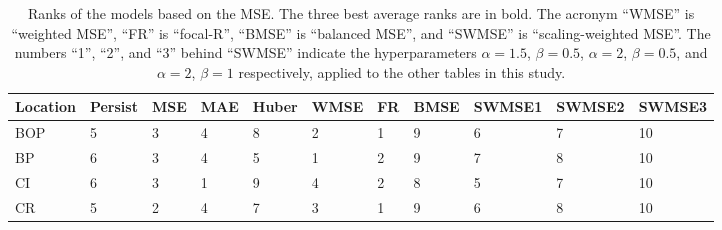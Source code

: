 \documentclass[11pt, a4paper]{article}
\begin{document}
\begin{table}[H]
\centering
\fontsize{5}{6}\selectfont
\caption{Ranks of the models based on the MSE. The three best average ranks are in bold. The acronym ``WMSE'' is ``weighted MSE'', ``FR'' is ``focal-R'', ``BMSE'' is ``balanced MSE'', and ``SWMSE'' is ``scaling-weighted MSE''. The numbers ``1'', ``2'', and ``3'' behind ``SWMSE'' indicate the hyperparameters $\alpha=1.5$, $\beta=0.5$, $\alpha=2$, $\beta=0.5$, and $\alpha=2$, $\beta=1$ respectively, applied to the other tables in this study.}\label{tb:rankmse}
\begin{tabular}{lllllllllll}
\multicolumn{1}{c}{\textbf{Location}} & \multicolumn{1}{c}{\textbf{Persist}} & \multicolumn{1}{c}{\textbf{MSE}} & \multicolumn{1}{c}{\textbf{MAE}} & \multicolumn{1}{c}{\textbf{Huber}} & \multicolumn{1}{c}{\textbf{WMSE}} & \multicolumn{1}{c}{\textbf{FR}} & \multicolumn{1}{c}{\textbf{BMSE}} & \multicolumn{1}{c}{\textbf{SWMSE1}} & \multicolumn{1}{c}{\textbf{SWMSE2}} & \multicolumn{1}{c}{\textbf{SWMSE3}} \\ \hline
BOP                         & 5                                        & 3                                & 4                                & 8                                  & 2                                 & 1                               & 9                                 & 6                                   & 7                                   & 10                                  \\
BP                        & 6                                        & 3                                & 4                                & 5                                  & 1                                 & 2                               & 9                                 & 7                                   & 8                                   & 10                                  \\
CI                        & 6                                        & 3                                & 1                                & 9                                  & 4                                 & 2                               & 8                                 & 5                                   & 7                                   & 10                                  \\
CR                           & 5                                        & 2                                & 4                                & 7                                  & 3                                 & 1                               & 9                                 & 6                                   & 8                                   & 10                                  \\

\end{tabular}
\end{table}
\end{document}
